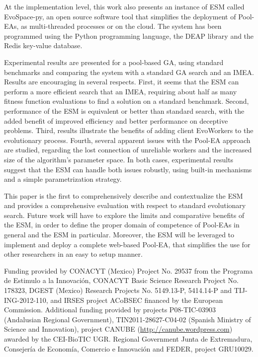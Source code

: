 At the implementation level, this work also presents an instance of
ESM called EvoSpace-py, an open source software tool that simplifies the deployment of Pool-EAs,
as multi-threaded processes or on the cloud.
The system has been programmed using the Python programming language, the DEAP library and the Redis key-value database.

Experimental results are presented for a pool-based GA, using standard benchmarks and comparing the system with a standard GA search and an IMEA.
Results are encouraging in several respects.
First, it seems that the ESM can perform a more efficient search that an IMEA, requiring about half as many fitness function evaluations to find
a solution on a standard benchmark.
Second, performance of the ESM is equivalent or better than standard search, with the added benefit of improved efficiency
and better performance on deceptive problems.
Third, results illustrate the benefits of adding client EvoWorkers to the evolutionary process.
Fourth, several apparent issues with the Pool-EA approach are studied, regarding the lost connection of unreliable workers and the increased size of the algorithm's parameter space.
In both cases, experimental results suggest that the ESM can handle both issues robustly, using built-in mechanisms and a simple
parametrization strategy.

This paper is the first to comprehensively describe and contextualize the ESM and provides a comprehensive evaluation with respect to standard evolutionary search.
Future work will have to explore the limits and comparative benefits of the ESM,
in order to define the proper domain of competence of Pool-EAs in general and the ESM in particular.
Moreover, the ESM will be leveraged to implement and deploy a complete web-based Pool-EA, that simplifies the use for other researchers in an easy to setup manner.


\begin{acknowledgements}
Funding provided by CONACYT (Mexico) Project No. 29537 from the Programa de Estimulo a la Innovaci\'on, CONACYT
Basic Science Research Project No. 178323, DGEST (Mexico) Research Projects No. 5149.13-P, 5414.14-P and TIJ-ING-2012-110,
and IRSES project ACoBSEC financed by the European Commission.
Additional funding provided by projects P08-TIC-03903 (Andalusian
Regional Government), TIN2011-28627-C04-02 (Spanish Ministry of
Science and Innovation), 
project CANUBE (\url{http://canube.wordpress.com}) awarded by the
CEI-BioTIC UGR. Regional Government Junta de Extremadura, Consejer\'ia
de Econom\'ia, Comercio e Innovaci\'on and FEDER, project GRU10029. 
\end{acknowledgements}


